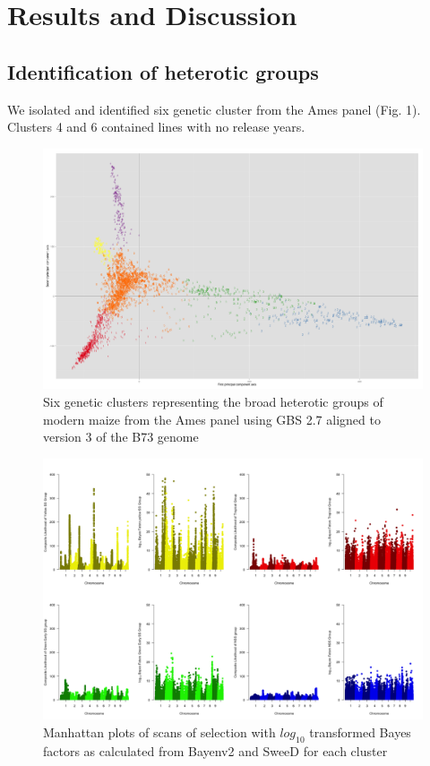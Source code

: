 \documentclass[9pt,twocolumn,twoside]{gsajnl}
\begin{document}
\section*{Results and Discussion}

\subsection{Identification of heterotic groups}
We isolated and identified six genetic cluster from the Ames panel (Fig. 1). Clusters 4 and 6 contained lines with no release years.
\begin{figure}[htbp]
\centering
\includegraphics[width=\linewidth]{6_clusters_placeholder.png}
\caption{Six genetic clusters representing the broad heterotic groups of modern maize from the Ames panel using GBS 2.7 aligned to version 3 of the B73 genome 
}
\label{fig:6clusters}
\end{figure}


\begin{figure}[htbp]
\centering
\includegraphics[width=\linewidth]{manhattan_mania.png}
\caption{Manhattan plots of scans of selection with $log_10$ transformed Bayes factors as calculated from Bayenv2 and SweeD for each cluster
}
\label{fig:manhattan}
\end{figure}
\end{document}
